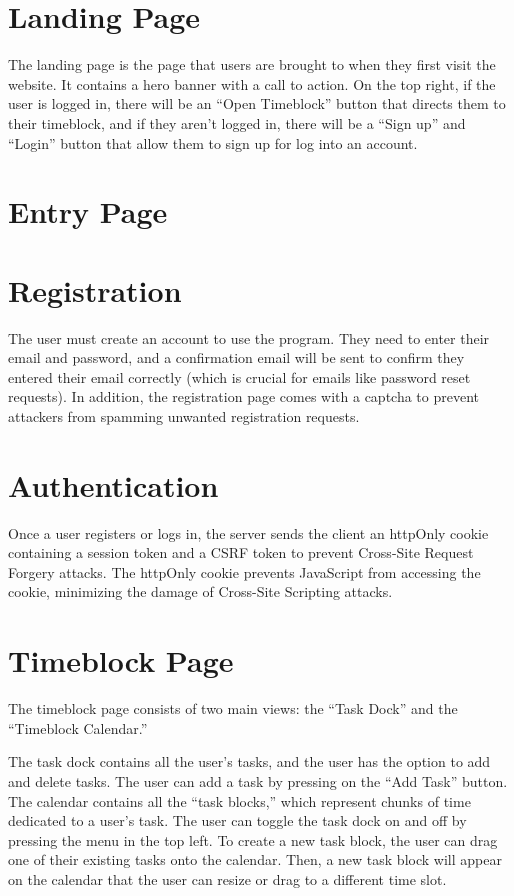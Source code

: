 \documentclass[notitlepage, 12pt]{report}
\begin{document}
\section*{Landing Page}
The landing page is the page that users are brought to when they first visit the website. It contains a hero banner with a call to action. On the top right, if the user is logged in, there will be an “Open Timeblock” button that directs them to their timeblock, and if they aren’t logged in, there will be a “Sign up” and “Login” button that allow them to sign up for log into an account.

\section*{Entry Page}

\section*{Registration}
The user must create an account to use the program. They need to enter their email and password, and a confirmation email will be sent to confirm they entered their email correctly (which is crucial for emails like password reset requests). In addition, the registration page comes with a captcha to prevent attackers from spamming unwanted registration requests.

\section*{Authentication}
Once a user registers or logs in, the server sends the client an httpOnly cookie containing a session token and a CSRF token to prevent Cross-Site Request Forgery attacks. The httpOnly cookie prevents JavaScript from accessing the cookie, minimizing the damage of Cross-Site Scripting attacks.

\section*{Timeblock Page}
The timeblock page consists of two main views: the “Task Dock” and the “Timeblock Calendar.”

The task dock contains all the user’s tasks, and the user has the option to add and delete tasks. The user can add a task by pressing on the “Add Task” button. The calendar contains all the “task blocks,” which represent chunks of time dedicated to a user’s task. The user can toggle the task dock on and off by pressing the menu in the top left. To create a new task block, the user can drag one of their existing tasks onto the calendar. Then, a new task block will appear on the calendar that the user can resize or drag to a different time slot.
\end{document}
